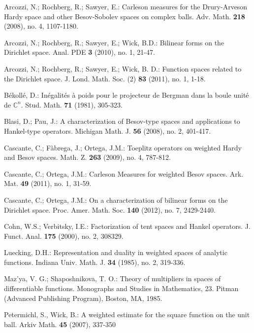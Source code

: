 \documentclass[12pt,twoside,leqno,final]{amsart}
\theoremstyle{plain}
\begin{document}
 \begin{thebibliography}{12}
 

 Arcozzi, N.; Rochberg, R.; Sawyer, E.:
Carleson measures for the Drury-Arveson Hardy space and other Besov-Sobolev spaces on complex balls. 
Adv. Math. \textbf{218} (2008), no. 4, 1107-1180.

 Arcozzi, N.; Rochberg, R.; Sawyer, E.; Wick, B.D.:
 Bilinear forms on the Dirichlet space. 
Anal. PDE \textbf{3} (2010), no. 1, 21-47.

 Arcozzi, N.; Rochberg, R.; Sawyer, E.; Wick, B. D.: 
Function spaces related to the Dirichlet space. 
J. Lond. Math. Soc. (2) \textbf{83} (2011), no. 1, 1-18.

 B\'ekoll\'e, D.: 
In\'egalit\'es \`a poids pour le projecteur de Bergman dans la boule unit\'e de ${{\mathbb C}}^n$. 
Stud. Math. \textbf{71} (1981), 305-323.

 Blasi, D.; Pau, J.:
 A characterization of Besov-type spaces and applications to Hankel-type operators. 
 Michigan Math. J. \textbf{56} (2008), no. 2, 401-417. 

 Cascante, C.; F\`abrega, J.;  Ortega, J.M.: 
Toeplitz operators on weighted Hardy and Besov spaces. 
Math. Z. \textbf{263} (2009), no. 4, 787-812.

 Cascante, C.;  Ortega, J.M.: 
Carleson Measures for weighted Besov spaces. 
Ark. Mat. \textbf{49} (2011), no. 1, 31-59.

 Cascante, C.; Ortega, J.M.: 
On a characterization of bilinear forms on the Dirichlet space. 
Proc. Amer. Math. Soc. \textbf{140} (2012), no. 7, 2429-2440.

 Cohn, W.S.; Verbitsky, I.E.:
 Factorization of tent spaces and Hankel operators. 
 J. Funct. Anal. \textbf{175} (2000), no. 2, 308329.

 Luecking, D.H.: 
Representation and duality in weighted spaces of analytic functions. 
Indiana Univ. Math. J. \textbf{34} (1985), no. 2, 319-336.

 Maz'ya, V. G.; Shaposhnikova, T. O.:
 Theory of multipliers in spaces of differentiable functions. 
 Monographs and Studies in Mathematics, 23. Pitman (Advanced Publishing Program), 
 Boston, MA, 1985.

 Petermichl, S., Wick, B.: 
A weighted estimate for the square function on the unit ball. 
Arkiv Math. \textbf{45} (2007), 337-350


\end{thebibliography}
\end{document}
